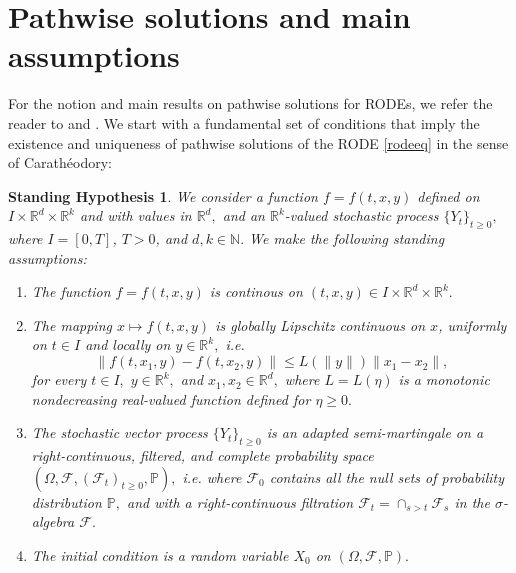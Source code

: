 \documentclass[reqno,12pt]{amsart}
\theoremstyle{plain} %
\newtheorem{stdhyp}{Standing Hypothesis}[section]
\theoremstyle{definition} %
\begin{document}
\section{Pathwise solutions and main assumptions}
\label{secpathwisesolution}

For the notion and main results on pathwise solutions for RODEs, we refer the reader to \cite[Section 2.1]{HanKloeden2017} and \cite[Section 3.3]{NeckelRupp2013}. We start with a fundamental set of conditions that imply the existence and uniqueness of pathwise solutions of the RODE \cref{rodeeq} in the sense of Carath\'eodory:
\begin{stdhyp}
    \label{standinghypotheses1}
    We consider a function $f=f(t, x, y)$ defined on $I\times \mathbb{R}^d\times\mathbb{R}^k$ and with values in $\mathbb{R}^d,$ and an $\mathbb{R}^k$-valued stochastic process $\{Y_t\}_{t\geq 0},$ where $I=[0, T]$, $T > 0$, and $d, k\in \mathbb{N}.$  We make the following standing assumptions:
    \begin{enumerate}
        \item \label{standinghypothesisfcontinuous} The function $f = f(t, x, y)$ is continous on $(t, x, y)\in I \times \mathbb{R}^d \times \mathbb{R}^k.$
        \item \label{standinghypothesisLipschitzbound} The mapping $x \mapsto f(t, x, y)$ is globally Lipschitz continuous on $x$, uniformly on $t\in I$ and locally on $y\in \mathbb{R}^k,$ i.e.
        \begin{equation}
            \label{Ltassumptionbasic}
            \|f(t, x_1, y) - f(t, x_2, y)\| \leq L(\|y\|) \|x_1 - x_2\|,
        \end{equation}
        for every $t\in I,$ $y\in\mathbb{R}^k,$ and $x_1, x_2 \in\mathbb{R}^d,$ where $L=L(\eta)$ is a monotonic nondecreasing real-valued function defined for $\eta \geq 0.$

        \item \label{standinghypothesisnoise} The stochastic vector process $\{Y_t\}_{t\geq 0}$ is an adapted semi-martingale on a right-continuous, filtered, and complete probability space $(\Omega, \mathcal{F}, (\mathcal{F}_t)_{t\geq 0}, \mathbb{P}),$ i.e. where $\mathcal{F}_0$ contains all the null sets of probability distribution $\mathbb{P},$ and with a right-continuous filtration $\mathcal{F}_t = \cap_{s > t} \mathcal{F}_s$ in the $\sigma$-algebra $\mathcal{F}.$
        
        \item \label{standinghypothesisic} The initial condition is a random variable $X_0$ on $(\Omega, \mathcal{F}, \mathbb{P}).$
    \end{enumerate}
\end{stdhyp}
\end{document}
